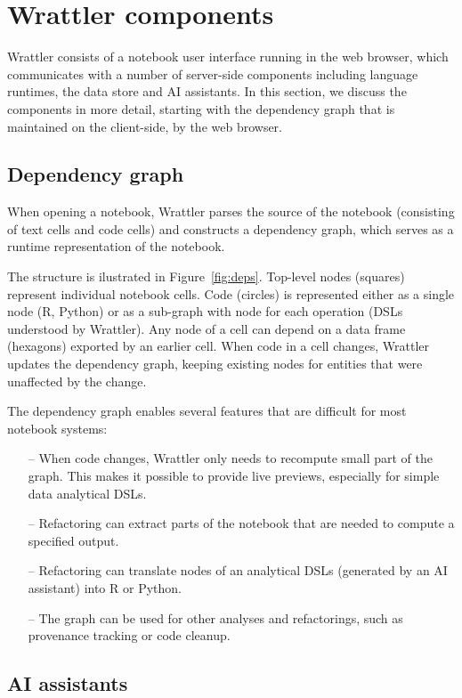 \documentclass[sigplan]{acmart}\settopmatter{printfolios=true,printccs=false,printacmref=false}
\begin{document}
\section{Wrattler components}

Wrattler consists of a notebook user interface running in the web browser, which communicates with 
a number of server-side components including language runtimes, the data store and AI assistants. 
In this section, we discuss the components in more detail, starting with the dependency graph
that is maintained on the client-side, by the web browser.

\subsection{Dependency graph}

When opening a notebook, Wrattler parses the source of the notebook (consisting of text cells and 
code cells) and constructs a dependency graph, which serves as a runtime representation of the
notebook. 

The structure is ilustrated in Figure~\ref{fig:deps}. Top-level nodes (squares) represent
individual notebook cells. Code (circles) is represented either as a single node (R, Python) or as 
a sub-graph with node for each operation (DSLs understood by Wrattler). Any node of a cell can 
depend on a data frame (hexagons) exported by an earlier cell. 
When code in a cell changes, Wrattler updates the dependency graph, keeping existing
nodes for entities that were unaffected by the change. 

The dependency graph enables several features that are difficult for most notebook systems:
%
\begin{itemize}
\item[--] When code changes, Wrattler only needs to recompute small part of the graph.
  This makes it possible to provide live previews, especially for simple data analytical DSLs.
\vspace{-0.85em}
\item[--] Refactoring can extract parts of the notebook that
  are needed to compute a specified output.
\vspace{0.25em}
\item[--] Refactoring can translate nodes of an analytical DSLs (generated by an AI assistant) into R or Python.
\vspace{0.25em}
\item[--] The graph can be used for other analyses and refactorings, such as provenance tracking
  or code cleanup.
\end{itemize}

\subsection{AI assistants}





\end{document}
